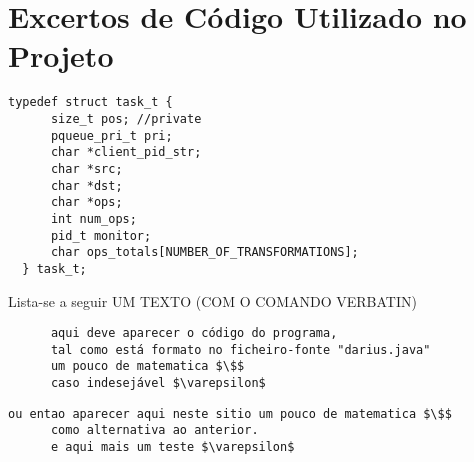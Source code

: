 \documentclass[11pt,a4paper]{report}%
\begin{document}
\appendix %
\chapter{Excertos de Código Utilizado no Projeto}



\label{code:task_struct}
\begin{lstlisting}[caption={Estrutura para pedidos de processamento de ficheiros}]
    typedef struct task_t {
      size_t pos; //private
      pqueue_pri_t pri;
      char *client_pid_str;
      char *src;
      char *dst;
      char *ops;
      int num_ops;
      pid_t monitor;
      char ops_totals[NUMBER_OF_TRANSFORMATIONS];
  } task_t;
\end{lstlisting}


Lista-se a seguir UM TEXTO (COM O COMANDO VERBATIN)
\begin{verbatim}
      aqui deve aparecer o código do programa,
      tal como está formato no ficheiro-fonte "darius.java"
      um pouco de matematica $\$$
      caso indesejável $\varepsilon$
\end{verbatim}

\begin{lstlisting}[caption={Exemplo de uma Listagem}, label={lstExe1}]
      ou entao aparecer aqui neste sitio um pouco de matematica $\$$
      como alternativa ao anterior.
      e aqui mais um teste $\varepsilon$
\end{lstlisting}

\newpage



\end{document}
